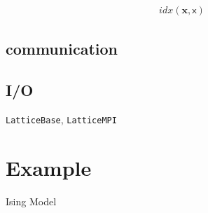 \documentclass{article}
\begin{document}
\begin{gather}
    idx(\mathbf{x},\mathsf{x}) %
\end{gather}

\subsection{communication}
\subsection{I/O}

\texttt{LatticeBase}, \texttt{LatticeMPI}

\section{Example}
Ising Model
\end{document}
